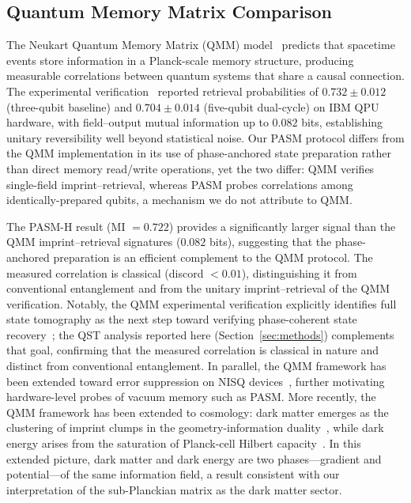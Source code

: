 ﻿\documentclass[12pt,a4paper]{article}
\begin{document}
\subsection{Quantum Memory Matrix Comparison}

The Neukart Quantum Memory Matrix (QMM) model~\cite{neukart2025,neukart2026qip} predicts that spacetime events store information in a Planck-scale memory structure, producing measurable correlations between quantum systems that share a causal connection. The experimental verification~\cite{neukart2026qip} reported retrieval probabilities of $0.732 \pm 0.012$ (three-qubit baseline) and $0.704 \pm 0.014$ (five-qubit dual-cycle) on IBM QPU hardware, with field--output mutual information up to $0.082$ bits, establishing unitary reversibility well beyond statistical noise. Our PASM protocol differs from the QMM implementation in its use of phase-anchored state preparation rather than direct memory read/write operations, yet the two differ: QMM verifies single-field imprint--retrieval, whereas PASM probes correlations among identically-prepared qubits, a mechanism we do not attribute to QMM.

The PASM-H result (MI $= 0.722$) provides a significantly larger signal than the QMM imprint--retrieval signatures ($0.082$ bits), suggesting that the phase-anchored preparation is an efficient complement to the QMM protocol. The measured correlation is classical (discord $< 0.01$), distinguishing it from conventional entanglement and from the unitary imprint--retrieval of the QMM verification. Notably, the QMM experimental verification explicitly identifies full state tomography as the next step toward verifying phase-coherent state recovery~\cite{neukart2026qip}; the QST analysis reported here (Section~\ref{sec:methods}) complements that goal, confirming that the measured correlation is classical in nature and distinct from conventional entanglement. In parallel, the QMM framework has been extended toward error suppression on NISQ devices~\cite{neukart2026qec}, further motivating hardware-level probes of vacuum memory such as PASM. More recently, the QMM framework has been extended to cosmology: dark matter emerges as the clustering of imprint clumps in the geometry-information duality~\cite{neukart2025dm}, while dark energy arises from the saturation of Planck-cell Hilbert capacity~\cite{neukart2025de}. In this extended picture, dark matter and dark energy are two phases---gradient and potential---of the same information field, a result consistent with our interpretation of the sub-Planckian matrix as the dark matter sector.
\end{document}
